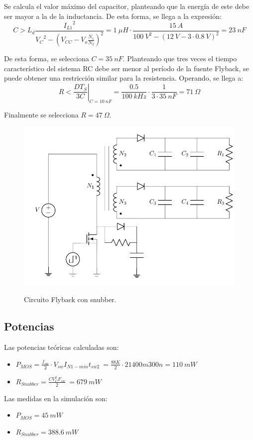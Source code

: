 Se calcula el valor máximo del capacitor, planteando que la energía de este debe ser mayor a la de la inductancia. De esta forma, se llega a la expresión:
\begin{equation}
	C > L_d  \frac{{I_{L1}}^2}{{V_{C}}^2 - \left( V_{CC} - V_{o} \frac{N_1}{N_2} \right)^2 } = 1 \ \mu H \cdot \frac{15 \ A}{{100 \ V}^2 - \left( 12 \ V - 3 \cdot 0.8 \ V \right)^2} = 23 \ nF
\end{equation}

De esta forma, se selecciona $C = 35 \ nF$. Planteando que tres veces el tiempo característico del sistema RC debe ser menor al período de la fuente Flyback, se puede obtener una restricción similar para la resistencia. Operando, se llega a:
\begin{equation}
	R < \left. \frac{DT_S}{3C} \right|_{C = 10 \ nF} = \frac{0.5}{100 \ kHz} \cdot \frac{1}{3 \cdot 35 \ nF} = 71 \ \Omega
\end{equation}

Finalmente se selecciona $R = 47 \ \Omega$.

\begin{figure}[H]
	\centering
	\includegraphics[width=0.4\linewidth, page = 1]{ImagenesParteII/FlybackSnubber.pdf}
	\label{fig:fly_snubber}
	\caption{Circuito Flyback con snubber.}
\end{figure}

\subsection{Potencias}
Las potencias teóricas calculadas son:
\begin{itemize}
\item $ P_{MOS} =\frac{f_{sw}}{2}\cdot V_{sw}I_{N1-min} t_{sw2}\ =\frac{88K}{2}\cdot 21 400m 300n = 110\ mW$
\item $ R_{Snubber} = \frac{CV_C^2 F_{sw}}{2}\ = 679 \ mW$
\end{itemize}
Las medidas en la simulación son:
\begin{itemize}
\item $ P_{MOS} = 45 \ mW $
\item $ R_{Snubber} = 388.6 \ mW$
\end{itemize}

